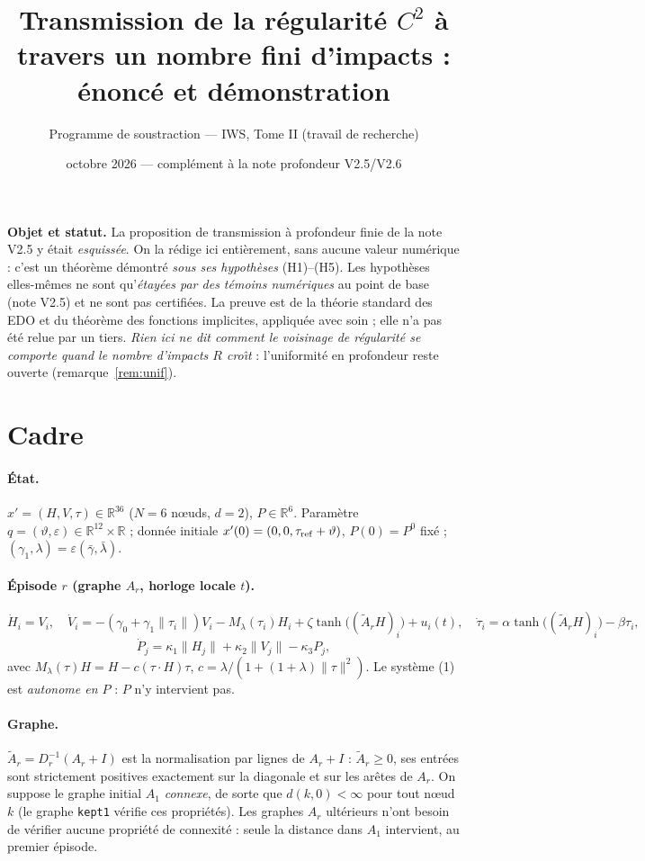 \documentclass[11pt,a4paper]{article}
\title{Transmission de la r\'egularit\'e $C^2$ \`a travers un nombre fini d'impacts :\\ \'enonc\'e et d\'emonstration}
\author{Programme de soustraction --- IWS, Tome II (travail de recherche)}
\date{octobre 2026 --- compl\'ement \`a la note \og profondeur \fg{} V2.5/V2.6}
\theoremstyle{remark}
\newcommand{\R}{\mathbb R}
\newcommand{\norm}[1]{\lVert #1\rVert}
\newcommand{\vth}{\vartheta}
\begin{document}
\maketitle

\noindent\textbf{Objet et statut.} La proposition de transmission \`a profondeur finie de la note V2.5 y \'etait \emph{esquiss\'ee}. On la r\'edige ici enti\`erement, sans aucune valeur num\'erique : c'est un th\'eor\`eme d\'emontr\'e \emph{sous ses hypoth\`eses} (H1)--(H5). Les hypoth\`eses elles-m\^emes ne sont qu'\emph{\'etay\'ees par des t\'emoins num\'eriques} au point de base (note V2.5) et ne sont pas certifi\'ees. La preuve est de la th\'eorie standard des EDO et du th\'eor\`eme des fonctions implicites, appliqu\'ee avec soin ; elle n'a pas \'et\'e relue par un tiers. \emph{Rien ici ne dit comment le voisinage de r\'egularit\'e se comporte quand le nombre d'impacts $R$ cro\^{\i}t} : l'uniformit\'e en profondeur reste ouverte (remarque~\ref{rem:unif}).

\section{Cadre}
\paragraph{\'Etat.} $x'=(H,V,\tau)\in\R^{36}$ ($N=6$ n\oe uds, $d=2$), $P\in\R^6$. Param\`etre $q=(\vth,\varepsilon)\in\R^{12}\times\R$ ; donn\'ee initiale $x'(0)=(0,0,\tau_{\rm ref}+\vth)$, $P(0)=P^0$ fix\'e ; $(\gamma_1,\lambda)=\varepsilon(\bar\gamma,\bar\lambda)$.

\paragraph{\'Episode $r$ (graphe $A_r$, horloge locale $t$).}
\[ \dot H_i=V_i,\quad \dot V_i=-(\gamma_0+\gamma_1\norm{\tau_i})V_i-M_\lambda(\tau_i)H_i+\zeta\tanh\bigl((\tilde A_rH)_i\bigr)+u_i(t),\quad \dot\tau_i=\alpha\tanh\bigl((\tilde A_rH)_i\bigr)-\beta\tau_i, \tag{1}\]
\[ \dot P_j=\kappa_1\norm{H_j}+\kappa_2\norm{V_j}-\kappa_3P_j, \tag{2}\]
avec $M_\lambda(\tau)H=H-c(\tau\!\cdot\!H)\tau$, $c=\lambda/(1+(1+\lambda)\norm\tau^2)$. Le syst\`eme (1) est \emph{autonome en $P$} : $P$ n'y intervient pas.

\paragraph{Graphe.} $\tilde A_r=D_r^{-1}(A_r+I)$ est la normalisation par lignes de $A_r+I$ : $\tilde A_r\ge0$, ses entr\'ees sont strictement positives exactement sur la diagonale et sur les ar\^etes de $A_r$. On suppose le graphe initial $A_1$ \emph{connexe}, de sorte que $d(k,0)<\infty$ pour tout n\oe ud $k$ (le graphe \texttt{kept1} v\'erifie ces propri\'et\'es). Les graphes $A_r$ ult\'erieurs n'ont besoin de v\'erifier aucune propri\'et\'e de connexit\'e : seule la distance dans $A_1$ intervient, au premier \'episode.
\end{document}
